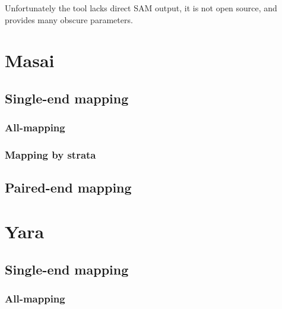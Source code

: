 Unfortunately the tool lacks direct SAM output, it is not open source, and provides many obscure parameters.

\begin{table}[h]
  \center
  \sffamily
  \resizebox{1.0\textwidth}{!}
  {
	\renewcommand{\tabcolsep}{0.8ex}
	
  }
\end{table}


\section{Masai}


\subsection{Single-end mapping}

\subsubsection{All-mapping}
\subsubsection{Mapping by strata}

\subsection{Paired-end mapping}


\section{Yara}


\subsection{Single-end mapping}
\subsubsection{All-mapping}
